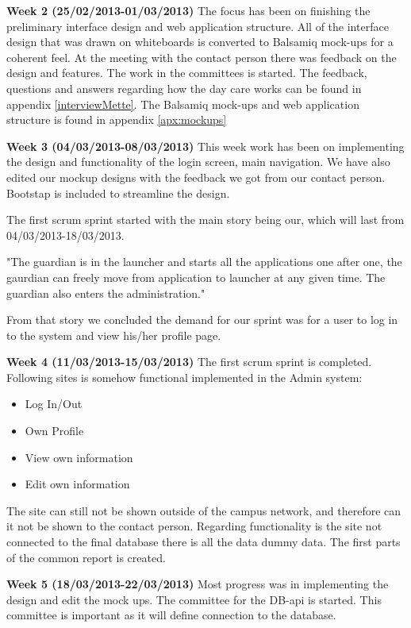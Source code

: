 \textbf{Week 2 (25/02/2013-01/03/2013)}
The focus has been on finishing the preliminary interface design and web application structure.
All of the interface design that was drawn on whiteboards is converted to Balsamiq mock-ups for a coherent feel.
At the meeting with the contact person there was feedback on the design and features. 
The work in the committees is started. 
The feedback, questions and answers regarding how the day care works can be found in appendix \vref{interviewMette}.
The Balsamiq mock-ups and web application structure is found in appendix \vref{apx:mockups} 

\textbf{Week 3 (04/03/2013-08/03/2013)}
This week work has been on implementing the design and functionality of the login screen, main navigation.  
We have also edited our mockup designs with the feedback we got from our contact person. 
Bootstap is included to streamline the design. 

The first scrum sprint started with the main story being  our, which will last from 04/03/2013-18/03/2013. 

"The guardian is in the launcher and starts all the applications one after one, the gaurdian can freely move from application to launcher at any given time.
The guardian also enters the administration."

From that story we concluded the demand for our sprint was for a user to log in to the system and view his/her profile page. 

\textbf{Week 4 (11/03/2013-15/03/2013) }
The first scrum sprint is completed. 
Following sites is somehow functional implemented in the Admin system:
\begin{itemize}
	\item Log In/Out
	\item Own Profile
	\item View own information
	\item Edit own information
\end{itemize}
The site can still not be shown outside of the campus network, and therefore can it not be shown to the contact person.
Regarding functionality is the site not connected to the final database there is all the data dummy data.  
The first parts of the common report is created.

\textbf{Week 5 (18/03/2013-22/03/2013)}
Most progress was in implementing the design and edit the mock ups. The committee for the DB-api is started. This committee is important as it will define connection to the database. 

